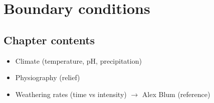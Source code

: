 \chapter{Boundary conditions}\label{ch:boundary_conditions}

\section{Chapter contents}
\begin{itemize}
    \item Climate (temperature, pH, precipitation)
    \item Physiography (relief)
    \item Weathering rates (time vs intensity) \(\rightarrow\) Alex Blum (reference)

\end{itemize}




\cleardoublepage

